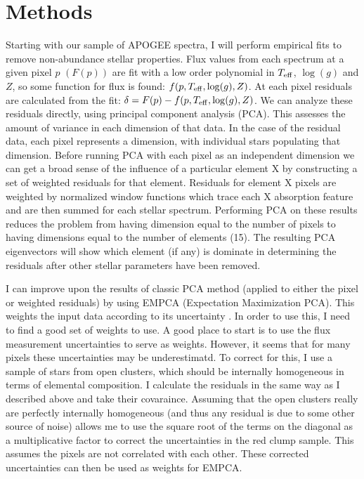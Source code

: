\documentclass[preprint]{aastex}
\begin{document}
\section{Methods}
\label{sec:methods}
Starting with our sample of APOGEE spectra, I will perform empirical fits to remove non-abundance stellar properties. Flux values from each spectrum at a given pixel $p$ $(F(p))$ are fit with a low order polynomial in $T_{\rm eff}$, $\log(g)$ and $Z$, so some function for flux is found: $f(p,T_{\rm eff},\log(g),Z)$. At each pixel residuals are calculated from the fit: $\delta = F(p) - f(p,T_{\rm eff},\log(g),Z)$. We can analyze these residuals directly, using principal component analysis (PCA). This assesses the amount of variance in each dimension of that data. In the case of the residual data, each pixel represents a dimension, with individual stars populating that dimension. Before running PCA with each pixel as an independent dimension we can get a broad sense of the influence of a particular element X by constructing a set of weighted residuals for that element. Residuals for element X pixels are weighted by normalized window functions which trace each X absorption feature and are then summed for each stellar spectrum. Performing PCA on these results reduces the problem from having dimension equal to the number of pixels to having dimensions equal to the number of elements (15). The resulting PCA eigenvectors will show which element (if any) is dominate in determining the residuals after other stellar parameters have been removed.

I can improve upon the results of classic PCA method (applied to either the pixel or weighted residuals) by using EMPCA (Expectation Maximization PCA). This weights the input data according to its uncertainty \citep{EMPCA}. In order to use this, I need to find a good set of weights to use. A good place to start is to use the flux measurement uncertainties to serve as weights. However, it seems that for many pixels these uncertainties may be underestimatd. To correct for this, I use a sample of stars from open clusters, which should be internally homogeneous in terms of elemental composition. I calculate the residuals in the same way as I described above and take their covaraince. Assuming that the open clusters really are perfectly internally homogeneous (and thus any residual is due to some other source of noise) allows me to use the square root of the terms on the diagonal as a multiplicative factor to correct the uncertainties in the red clump sample. This assumes the pixels are not correlated with each other. These corrected uncertainties can then be used as weights for EMPCA.
\end{document}
